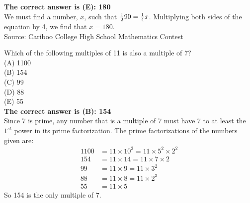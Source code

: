 \documentclass{article}
\begin{document}

\textbf{The correct answer is (E): 180}\\
We must find a number, $x$, such that $\frac{1}{2}\*90=\frac{1}{4}\*x$.  Multiplying both sides of the equation by 4, we find that $x=180$.
\\[5 ex]

\scriptsize
Source: Cariboo College High School Mathematics Contest

\normalsize
Which of the following multiples of 11 is also a multiple of 7?\\
(A) 1100\\
(B) 154\\
(C) 99\\
(D) 88\\
(E) 55\\


\textbf{The correct answer is (B): 154}\\
Since 7 is prime, any number that is a multiple of 7 must have 7 to at least the $1^{st}$ power in its prime factorization. The prime factorizations of the numbers given are:\\
\begin{align*} 
1100 &=11\times10^2=11\times5^{2}\times2^2\\
154 &=11\times14=11\times7\times2\\
99 &=11\times9=11\times3^2\\
88 &=11\times8=11\times2^3\\
55 &=11\times5
\end{align*}
So 154 is the only multiple of 7.
\\[5 ex]
\end{document}
